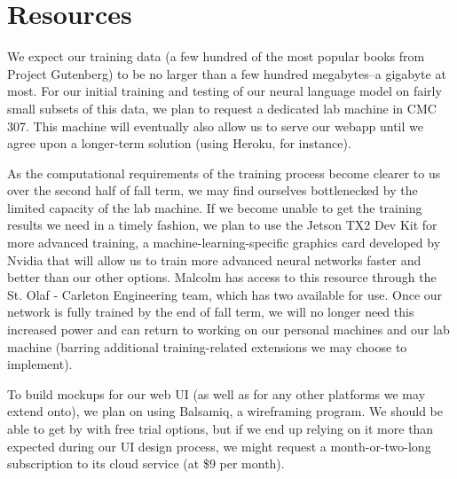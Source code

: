 \section{Resources}\label{sec:resources}
We expect our training data (a few hundred of the most popular books from Project
Gutenberg) to be no larger than a few hundred megabytes--a gigabyte at most.
For our initial training and testing of our neural language model on fairly small
subsets of this data, we plan to request a dedicated lab machine in CMC 307.
This machine will eventually also allow us to serve our webapp until we agree
upon a longer-term solution (using Heroku, for instance).

As the computational requirements of the training process become clearer to
us over the second half of fall term, we may find ourselves bottlenecked by
the limited capacity of the lab machine.  If we become unable to get the training
results we need in a timely fashion, we plan to use the Jetson TX2 Dev Kit for
more advanced training, a machine-learning-specific graphics card developed by
Nvidia that will allow us to train more advanced neural networks faster and
better than our other options.  Malcolm has access to this resource through
the St. Olaf - Carleton Engineering team, which has two available for use.
Once our network is fully trained by the end of fall term, we will no longer
need this increased power and can return to working on our personal machines
and our lab machine (barring additional training-related extensions we may
choose to implement).

To build mockups for our web UI (as well as for any other platforms we may extend
onto), we plan on using Balsamiq, a wireframing program.  We should be able to
get by with free trial options, but if we end up relying on it more than expected
during our UI design process, we might request a month-or-two-long subscription
to its cloud service (at \$9 per month).
